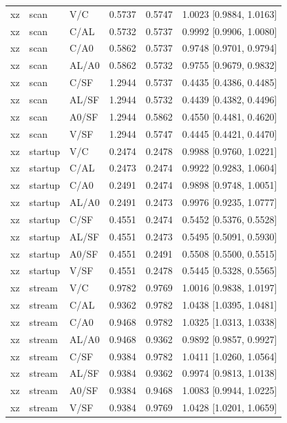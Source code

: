 \begin{longtable}{lllrrl}
xz & scan & V/C & 0.5737 & 0.5747 & 1.0023 [0.9884, 1.0163] \\
xz & scan & C/AL & 0.5732 & 0.5737 & 0.9992 [0.9906, 1.0080] \\
xz & scan & C/A0 & 0.5862 & 0.5737 & 0.9748 [0.9701, 0.9794] \\
xz & scan & AL/A0 & 0.5862 & 0.5732 & 0.9755 [0.9679, 0.9832] \\
xz & scan & C/SF & 1.2944 & 0.5737 & 0.4435 [0.4386, 0.4485] \\
xz & scan & AL/SF & 1.2944 & 0.5732 & 0.4439 [0.4382, 0.4496] \\
xz & scan & A0/SF & 1.2944 & 0.5862 & 0.4550 [0.4481, 0.4620] \\
xz & scan & V/SF & 1.2944 & 0.5747 & 0.4445 [0.4421, 0.4470] \\
xz & startup & V/C & 0.2474 & 0.2478 & 0.9988 [0.9760, 1.0221] \\
xz & startup & C/AL & 0.2473 & 0.2474 & 0.9922 [0.9283, 1.0604] \\
xz & startup & C/A0 & 0.2491 & 0.2474 & 0.9898 [0.9748, 1.0051] \\
xz & startup & AL/A0 & 0.2491 & 0.2473 & 0.9976 [0.9235, 1.0777] \\
xz & startup & C/SF & 0.4551 & 0.2474 & 0.5452 [0.5376, 0.5528] \\
xz & startup & AL/SF & 0.4551 & 0.2473 & 0.5495 [0.5091, 0.5930] \\
xz & startup & A0/SF & 0.4551 & 0.2491 & 0.5508 [0.5500, 0.5515] \\
xz & startup & V/SF & 0.4551 & 0.2478 & 0.5445 [0.5328, 0.5565] \\
xz & stream & V/C & 0.9782 & 0.9769 & 1.0016 [0.9838, 1.0197] \\
xz & stream & C/AL & 0.9362 & 0.9782 & 1.0438 [1.0395, 1.0481] \\
xz & stream & C/A0 & 0.9468 & 0.9782 & 1.0325 [1.0313, 1.0338] \\
xz & stream & AL/A0 & 0.9468 & 0.9362 & 0.9892 [0.9857, 0.9927] \\
xz & stream & C/SF & 0.9384 & 0.9782 & 1.0411 [1.0260, 1.0564] \\
xz & stream & AL/SF & 0.9384 & 0.9362 & 0.9974 [0.9813, 1.0138] \\
xz & stream & A0/SF & 0.9384 & 0.9468 & 1.0083 [0.9944, 1.0225] \\
xz & stream & V/SF & 0.9384 & 0.9769 & 1.0428 [1.0201, 1.0659] \\
\bottomrule\end{longtable}
